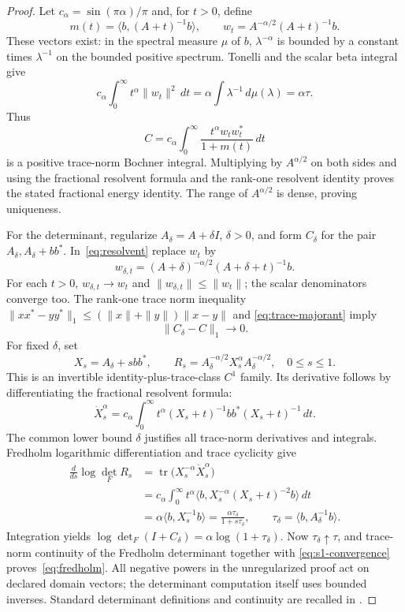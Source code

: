 \documentclass[11pt]{article}
\newcommand{\tr}{\operatorname{tr}}
\begin{document}
\begin{proof}
Let $c_\alpha=\sin(\pi\alpha)/\pi$ and, for $t>0$, define
\[
 m(t)=\langle b,(A+t)^{-1}b\rangle,\qquad
 w_t=A^{-\alpha/2}(A+t)^{-1}b.
\]
These vectors exist: in the spectral measure $\mu$ of $b$,
$\lambda^{-\alpha}$ is bounded by a constant times $\lambda^{-1}$
on the bounded positive spectrum. Tonelli and the scalar beta integral
give
\begin{equation}\label{eq:trace-majorant}
 c_\alpha\int_0^\infty t^\alpha\|w_t\|^2\,dt
       =\alpha\int\lambda^{-1}\,d\mu(\lambda)=\alpha\tau.
\end{equation}
Thus
\begin{equation}\label{eq:resolvent}
 C=c_\alpha\int_0^\infty\frac{t^\alpha w_tw_t^*}{1+m(t)}\,dt
\end{equation}
is a positive trace-norm Bochner integral. Multiplying by
$A^{\alpha/2}$ on both sides and using the fractional resolvent formula
and the rank-one resolvent identity proves the stated fractional energy
identity. The range of $A^{\alpha/2}$ is dense, proving uniqueness.

For the determinant, regularize $A_\delta=A+\delta I$, $\delta>0$,
and form $C_\delta$ for the pair $A_\delta,A_\delta+bb^*$.
In~\eqref{eq:resolvent} replace $w_t$ by
\[
 w_{\delta,t}=(A+\delta)^{-\alpha/2}(A+\delta+t)^{-1}b.
\]
For each $t>0$, $w_{\delta,t}\to w_t$ and
$\|w_{\delta,t}\|\le\|w_t\|$; the scalar denominators converge too.
The rank-one trace norm inequality
$\|xx^*-yy^*\|_1\le(\|x\|+\|y\|)\|x-y\|$ and
\eqref{eq:trace-majorant} imply
\begin{equation}\label{eq:s1-convergence}
                     \|C_\delta-C\|_1\longrightarrow0.
\end{equation}
For fixed $\delta$, set
\[
 X_s=A_\delta+sbb^*,\qquad
 R_s=A_\delta^{-\alpha/2}X_s^\alpha A_\delta^{-\alpha/2},
                  \quad 0\le s\le1.
\]
This is an invertible identity-plus-trace-class $C^1$ family. Its
derivative follows by differentiating the fractional resolvent formula:
\[
 \dot X_s^\alpha=c_\alpha\int_0^\infty
        t^\alpha(X_s+t)^{-1}bb^*(X_s+t)^{-1}\,dt.
\]
The common lower bound $\delta$ justifies all trace-norm derivatives
and integrals. Fredholm logarithmic differentiation and trace cyclicity
give
\begin{align*}
 \frac{d}{ds}\log\det_F R_s
 &=\tr\bigl(X_s^{-\alpha}\dot X_s^\alpha\bigr)\\
 &=c_\alpha\int_0^\infty t^\alpha
        \langle b,X_s^{-\alpha}(X_s+t)^{-2}b\rangle\,dt\\
 &=\alpha\langle b,X_s^{-1}b\rangle
   =\frac{\alpha\tau_\delta}{1+s\tau_\delta},
       \qquad\tau_\delta=\langle b,A_\delta^{-1}b\rangle.
\end{align*}
Integration yields $\log\det_F(I+C_\delta)
=\alpha\log(1+\tau_\delta)$. Now $\tau_\delta\uparrow\tau$, and
trace-norm continuity of the Fredholm determinant together with
\eqref{eq:s1-convergence} proves~\eqref{eq:fredholm}.
All negative powers in the unregularized proof act on declared domain
vectors; the determinant computation itself uses bounded inverses.
Standard determinant definitions and continuity are recalled in
\cite[Sections 3--4]{Bornemann}.
\end{proof}
\end{document}
